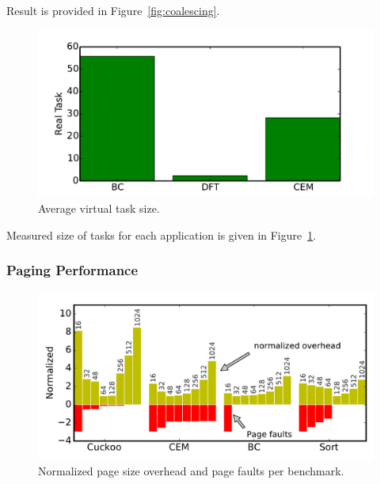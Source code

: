 Result is provided in Figure~\ref{fig:coalescing}.

\begin{figure}
	\centering
	\includegraphics[width=\columnwidth]{figures/averageVirtualTaskSize}
	\caption{Average virtual task size.}
	\label{fig:aveVirtuTaskSize}
\end{figure}

Measured size of tasks for each application is given in Figure~\ref{fig:aveVirtuTaskSize}.

\subsubsection{\sys Paging Performance}
\label{sec:results_memory_management}

\begin{figure}
	\centering
	\includegraphics[width=\columnwidth]{figures/pagSizeOverhead}
	\caption{Normalized page size overhead and page faults per benchmark.}
	\label{fig:IPOSPerformance}
	\label{fig:page_size}
\end{figure}

